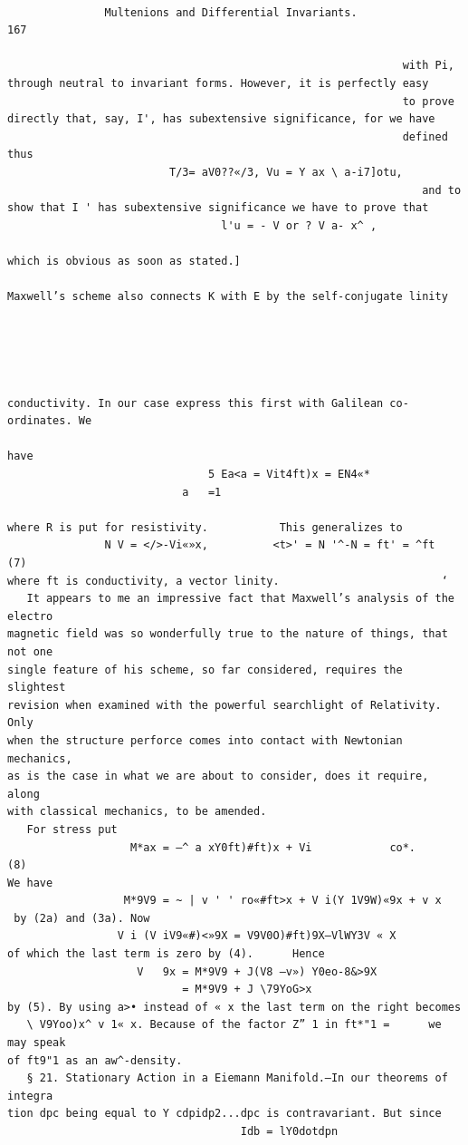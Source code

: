 \documentclass[10pt]{article}
\begin{document}
\clearpage
\begin{verbatim}

               Multenions and Differential Invariants.                   167

                                                             with Pi, through neutral to invariant forms. However, it is perfectly easy
                                                             to prove directly that, say, I', has subextensive significance, for we have
                                                             defined thus
                         T/3= aV0??«/3, Vu = Y ax \ a-i7]otu,
                                                                and to show that I ' has subextensive significance we have to prove that
                                 l'u = - V or ? V a- x^ ,
                                                                     which is obvious as soon as stated.]
                                                                       Maxwell’s scheme also connects K with E by the self-conjugate linity




                                                                     conductivity. In our case express this first with Galilean co-ordinates. We
                                                                     have
                               5 Ea<a = Vit4ft)x = EN4«*
                           a   =1
                                                                    where R is put for resistivity.           This generalizes to
               N V = </>-Vi«»x,          <t>' = N '^-N = ft' = ^ft         (7)
where ft is conductivity, a vector linity.                         ‘
   It appears to me an impressive fact that Maxwell’s analysis of the electro­
magnetic field was so wonderfully true to the nature of things, that not one
single feature of his scheme, so far considered, requires the slightest
revision when examined with the powerful searchlight of Relativity. Only
when the structure perforce comes into contact with Newtonian mechanics,
as is the case in what we are about to consider, does it require, along
with classical mechanics, to be amended.
   For stress put
                   M*ax = —^ a xY0ft)#ft)x + Vi            co*.            (8)
We have
                  M*9V9 = ~ | v ' ' ro«#ft>x + V i(Y 1V9W)«9x + v x
 by (2a) and (3a). Now
                 V i (V iV9«#)<»9X = V9V0O)#ft)9X—VlWY3V « X
of which the last term is zero by (4).      Hence
                    V   9x = M*9V9 + J(V8 —v») Y0eo-8&>9X
                           = M*9V9 + J \79YoG>x
by (5). By using a>• instead of « x the last term on the right becomes
   \ V9Yoo)x^ v 1« x. Because of the factor Z” 1 in ft*"1 =      we may speak
of ft9"1 as an aw^-density.
   § 21. Stationary Action in a Eiemann Manifold.—In our theorems of integra­
tion dpc being equal to Y cdpidp2...dpc is contravariant. But since
                                    Idb = lY0dotdpn


\end{verbatim}
\end{document}
